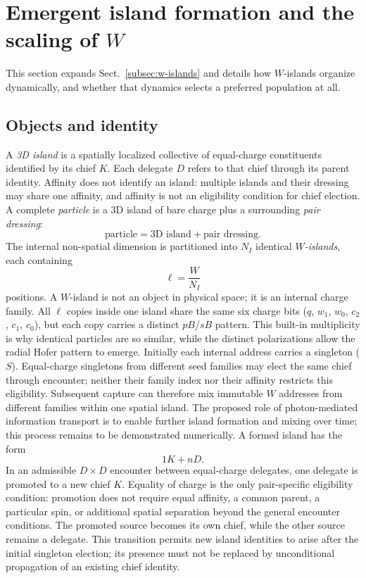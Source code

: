 \documentclass{ijuc}
\begin{document}
\section{Emergent island formation and the scaling of $W$}\label{sec:dynamic-charge-quantization}
This section expands Sect.~\ref{subsec:w-islands} and details how $W$-islands organize dynamically, and whether that dynamics selects a preferred population at all.
\subsection{Objects and identity}
A \emph{3D island} is a spatially localized collective of equal-charge constituents identified by its chief $K$. Each delegate $D$ refers to that chief through its parent identity. Affinity does not identify an island: multiple islands and their dressing may share one affinity, and affinity is not an eligibility condition for chief election. A complete \emph{particle} is a 3D island of bare charge plus a surrounding \emph{pair dressing}:
\begin{equation}
\text{particle} = \text{3D island} + \text{pair dressing}.
\end{equation}
The internal non-spatial dimension is partitioned into $N_I$ identical \emph{$W$-islands}, each containing
\begin{equation}
\ell = \frac{W}{N_I}
\end{equation}
positions. A $W$-island is not an object in physical space; it is an internal charge family. All $\ell$ copies inside one island share the same six charge bits ($q$, $w_1$, $w_0$, $c_2$, $c_1$, $c_0$), but each copy carries a distinct $pB$/$sB$ pattern. This built-in multiplicity is why identical particles are so similar, while the distinct polarizations allow the radial Hofer pattern to emerge.
Initially each internal address carries a singleton ($S$). Equal-charge singletons from different seed families may elect the same chief through encounter; neither their family index nor their affinity restricts this eligibility. Subsequent capture can therefore mix immutable $W$ addresses from different families within one spatial island. The proposed role of photon-mediated information transport is to enable further island formation and mixing over time; this process remains to be demonstrated numerically. A formed island has the form
\begin{equation}
1K + nD.
\end{equation}
In an admissible $D\times D$ encounter between equal-charge delegates, one delegate is promoted to a new chief $K$. Equality of charge is the only pair-specific eligibility condition: promotion does not require equal affinity, a common parent, a particular spin, or additional spatial separation beyond the general encounter conditions. The promoted source becomes its own chief, while the other source remains a delegate. This transition permits new island identities to arise after the initial singleton election; its presence must not be replaced by unconditional propagation of an existing chief identity.
\end{document}
